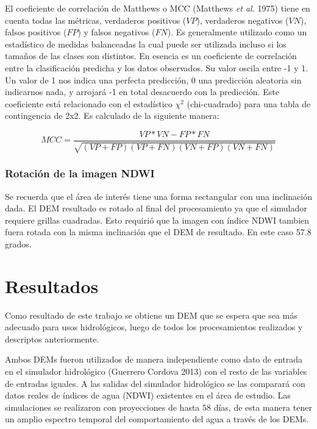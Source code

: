 \documentclass[10pt,a4paper, twoside]{report}
\begin{document}
El coeficiente de correlación de Matthews o MCC (Matthews \textit{et al.} 1975) tiene en cuenta todas las métricas, verdaderos positivos ($VP$), verdaderos negativos ($VN$), falsos positivos ($FP$) y falsos negativos ($FN$). Es generalmente utilizado como un estadístico de medidas balanceadas la cual puede ser utilizada incluso si los tamaños de las clases son distintos. En esencia es un coeficiente de correlación entre la clasificación predicha y los datos observados. Su valor oscila entre -1 y 1. Un valor de 1 nos indica una perfecta predicción, 0 una predicción aleatoria sin indicarnos nada, y arrojará -1 en total desacuerdo con la predicción. Este coeficiente está relacionado con el estadístico ${\chi}^2$ (chi-cuadrado) para una tabla de contingencia de 2x2. Es calculado de la siguiente manera:


\begin{equation}
MCC=\frac{VP*VN - FP*FN}{\sqrt{(VP+FP)(VP+FN)(VN+FP)(VN+FN)}}
\end{equation}



\subsection{Rotación de la imagen NDWI}

Se recuerda que el área de interés tiene una forma rectangular con una inclinación dada. El DEM resultado es rotado al final del procesamiento ya que el simulador requiere grillas cuadradas. Esto requirió que la imagen con índice NDWI tambien fuera rotada con la misma inclinación que el DEM de resultado. En este caso 57.8 grados.



\chapter{Resultados}

Como resultado de este trabajo se obtiene un DEM que se espera que sea más adecuado para usos hidrológicos, luego de todos los procesamientos realizados y descriptos anteriormente.


Ambos DEMs fueron utilizados de manera independiente como dato de entrada en el simulador hidrológico (Guerrero Cordova 2013) con el resto de las variables de entradas iguales. A las salidas del simulador hidrológico se las comparará con datos reales de índices de agua (NDWI) existentes en el área de estudio. Las simulaciones se realizaron con proyecciones de hasta 58 días, de esta manera tener un amplio espectro temporal del comportamiento del agua a través de los DEMs.
\end{document}
